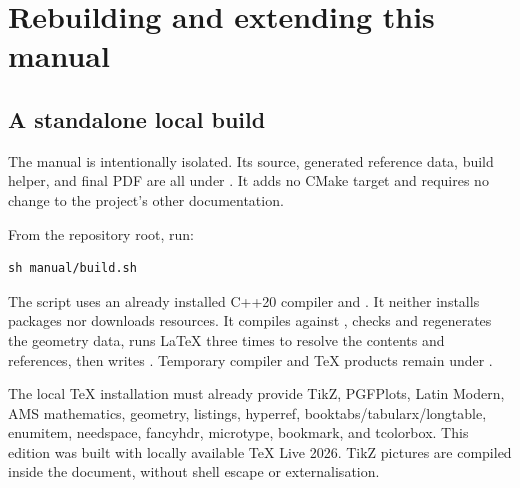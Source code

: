 \chapter{Rebuilding and extending this manual}\label{chap:reproduction}
\section{A standalone local build}
The manual is intentionally isolated. Its source, generated reference data,
build helper, and final PDF are all under . It adds no CMake
target and requires no change to the project's other documentation.

From the repository root, run:
\begin{lstlisting}[style=plain]
sh manual/build.sh
\end{lstlisting}
The script uses an already installed C++20 compiler and .
It neither installs packages nor downloads resources. It compiles
 against , checks and
regenerates the geometry data, runs LaTeX three times to resolve the contents
and references, then writes . Temporary
compiler and TeX products remain under .

The local TeX installation must already provide TikZ, PGFPlots, Latin Modern,
AMS mathematics, geometry, listings, hyperref, booktabs/tabularx/longtable,
enumitem, needspace, fancyhdr, microtype, bookmark, and tcolorbox. This edition
was built with locally available TeX Live 2026. TikZ pictures are compiled
inside the document, without shell escape or externalisation.

